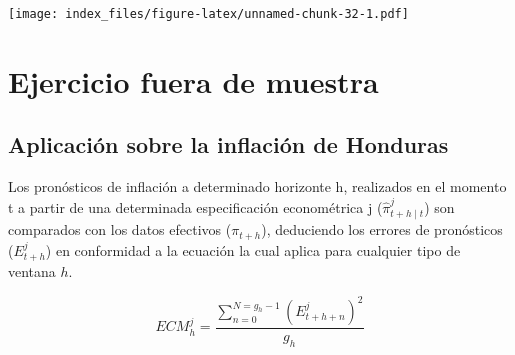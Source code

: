 \documentclass[
]{book}
\newenvironment{Shaded}{\begin{snugshade}}{\end{snugshade}}
\newcommand{\AttributeTok}[1]{\textcolor[rgb]{0.77,0.63,0.00}{#1}}
\newcommand{\DecValTok}[1]{\textcolor[rgb]{0.00,0.00,0.81}{#1}}
\newcommand{\FunctionTok}[1]{\textcolor[rgb]{0.00,0.00,0.00}{#1}}
\newcommand{\NormalTok}[1]{#1}
\newcommand{\OtherTok}[1]{\textcolor[rgb]{0.56,0.35,0.01}{#1}}
\newcommand{\SpecialCharTok}[1]{\textcolor[rgb]{0.00,0.00,0.00}{#1}}
\newcommand{\StringTok}[1]{\textcolor[rgb]{0.31,0.60,0.02}{#1}}
\begin{document}
\begin{Shaded}
\end{Shaded}

\texttt{[image: index\_files/figure-latex/unnamed-chunk-32-1.pdf]}

\hypertarget{ejercicio-fuera-de-muestra}{%
\chapter{Ejercicio fuera de muestra}\label{ejercicio-fuera-de-muestra}}

\hypertarget{aplicaciuxf3n-sobre-la-inflaciuxf3n-de-honduras}{%
\section{Aplicación sobre la inflación de Honduras}\label{aplicaciuxf3n-sobre-la-inflaciuxf3n-de-honduras}}

Los pronósticos de inflación a determinado horizonte h, realizados en el momento t a partir de una determinada especificación econométrica j (\(\hat{\pi}_{t+h\mid t}^{j}\)) son comparados con los datos efectivos (\(\pi_{t+h}\)), deduciendo los errores de pronósticos (\(E_{t+h}^{j}\)) en conformidad a la ecuación \label{eq:1} la cual aplica para cualquier tipo de ventana \(h\).

\begin{equation} 
 ECM_{h}^{j}=\frac{\sum\limits_{n=0}^{N=g_{h}-1} (E_{t+h+n}^{j})^{2}}{g_{h}}
 \label{eq:1}
\end{equation}
\end{document}
